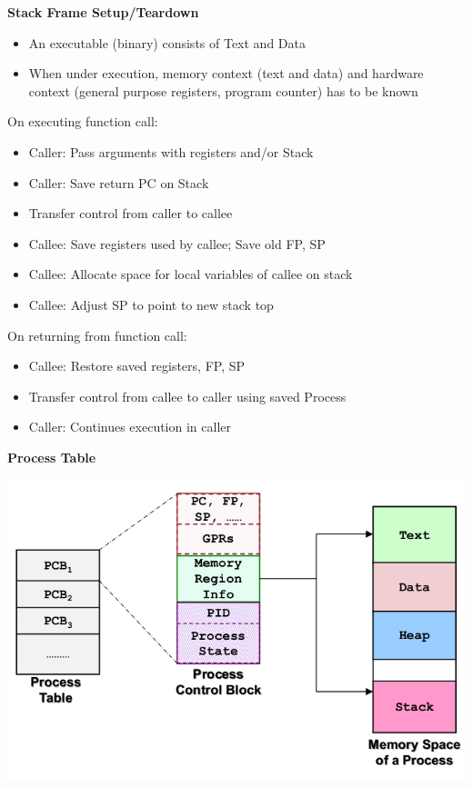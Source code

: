 \documentclass[a4paper, 12pt]{article}
\begin{document}
\begin{multicols*}{3}
\textbf{Stack Frame Setup/Teardown}
\begin{itemize}
    \item An executable (binary) consists of Text and Data
    \item When under execution, memory context (text and data) and hardware context (general purpose registers, program counter) has to be known
\end{itemize}
On executing function call:
\begin{itemize}
    \item Caller: Pass arguments with registers and/or Stack
    \item Caller: Save return PC on Stack
    \item Transfer control from caller to callee
    \item Callee: Save registers used by callee; Save old FP, SP
    \item Callee: Allocate space for local variables of callee on stack
    \item Callee: Adjust SP to point to new stack top
\end{itemize}
On returning from function call:
\begin{itemize}
    \item Callee: Restore saved registers, FP, SP
    \item Transfer control from callee to caller using saved Process
    \item Caller: Continues execution in caller
\end{itemize}

\medskip
    
\textbf{Process Table}
\begin{center}
    \includegraphics[scale=0.28]{process-table.png} \\
\end{center}


\end{multicols*}
\end{document}
